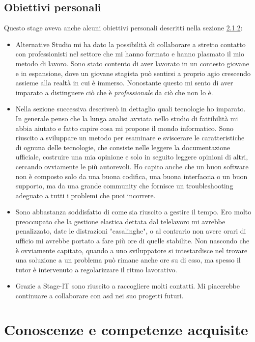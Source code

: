 \subsection{Obiettivi personali}
Questo stage aveva anche alcuni obiettivi personali descritti nella sezione \hyperref[sec:obiettivi-pers]{2.1.2}:
\begin{itemize}
    \item Alternative Studio mi ha dato la possibilità di collaborare a stretto contatto con professionisti nel settore che mi hanno formato
    e hanno plasmato il mio metodo di lavoro. Sono stato contento di aver lavorato in un contesto giovane e in espansione, dove un giovane
    stagista può sentirsi a proprio agio crescendo assieme alla realtà in cui è immerso. Nonostante questo mi sento di aver imparato a
    distinguere ciò che è \textit{professionale} da ciò che non lo è.
    \item Nella sezione successiva descriverò in dettaglio quali tecnologie ho imparato. In generale penso che la lunga analisi avviata
    nello studio di fattibilità mi abbia aiutato e fatto capire cosa mi propone il mondo informatico. Sono riuscito a sviluppare un metodo
    per esaminare e sviscerare le caratteristiche di ognuna delle tecnologie, che consiste nelle leggere la documentazione ufficiale,
    costruire una mia opinione e solo in seguito leggere opinioni di altri, cercando ovviamente le più autorevoli. Ho capito anche che un
    buon software non è composto solo da una buona codifica, una buona interfaccia o un buon supporto, ma da una grande community che
    fornisce un troubleshooting adeguato a tutti i problemi che puoi incorrere.
    \item Sono abbastanza soddisfatto di come sia riuscito a gestire il tempo. Ero molto preoccupato che la gestione elastica dettata dal
    telelavoro mi avrebbe penalizzato, date le distrazioni "casalinghe", o al contrario non avere orari di ufficio mi avrebbe portato a fare
    più ore di quelle stabilite. Non nascondo che è ovviamente capitato, quando a uno sviluppatore si intestardisce nel trovare una
    soluzione a un problema può rimane anche ore su di esso, ma spesso il tutor è intervenuto a regolarizzare il ritmo lavorativo. 
    \item Grazie a Stage-IT sono riuscito a raccogliere molti contatti. Mi piacerebbe continuare a collaborare con \acrlong{asd} nei suo
    progetti futuri.
\end{itemize}

\section{Conoscenze e competenze acquisite}
